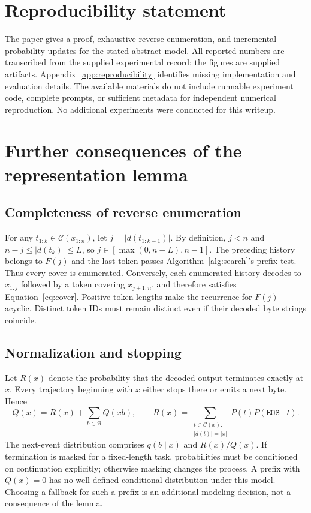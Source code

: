 \documentclass{article}
\newcommand{\bytes}{\mathcal{B}}
\newcommand{\cover}{\mathcal{C}}
\newcommand{\decode}{d}
\newcommand{\eos}{\mathtt{EOS}}
\begin{document}
\section*{Reproducibility statement}
The paper gives a proof, exhaustive reverse enumeration, and incremental probability updates for the stated abstract model. All reported numbers are transcribed from the supplied experimental record; the figures are supplied artifacts. Appendix~\ref{app:reproducibility} identifies missing implementation and evaluation details. The available materials do not include runnable experiment code, complete prompts, or sufficient metadata for independent numerical reproduction. No additional experiments were conducted for this writeup.

\clearpage



\clearpage
\appendix
\section{Further consequences of the representation lemma}
\label{app:proofs}
\subsection{Completeness of reverse enumeration}
For any $t_{1:k}\in\cover(x_{1:n})$, let $j=|\decode(t_{1:k-1})|$. By definition, $j<n$ and $n-j\leq|\decode(t_k)|\leq L$, so $j\in[\max(0,n-L),n-1]$. The preceding history belongs to $F(j)$ and the last token passes Algorithm~\ref{alg:search}'s prefix test. Thus every cover is enumerated. Conversely, each enumerated history decodes to $x_{1:j}$ followed by a token covering $x_{j+1:n}$, and therefore satisfies Equation~\ref{eq:cover}. Positive token lengths make the recurrence for $F(j)$ acyclic. Distinct token IDs must remain distinct even if their decoded byte strings coincide.

\subsection{Normalization and stopping}
Let $R(x)$ denote the probability that the decoded output terminates exactly at $x$. Every trajectory beginning with $x$ either stops there or emits a next byte. Hence
\begin{equation}
 Q(x)=R(x)+\sum_{b\in\bytes}Q(xb),\qquad
 R(x)=\sum_{\substack{t\in\cover(x):\\|\decode(t)|=|x|}}P(t)P(\eos\mid t).
\end{equation}
The next-event distribution comprises $q(b\mid x)$ and $R(x)/Q(x)$. If termination is masked for a fixed-length task, probabilities must be conditioned on continuation explicitly; otherwise masking changes the process. A prefix with $Q(x)=0$ has no well-defined conditional distribution under this model. Choosing a fallback for such a prefix is an additional modeling decision, not a consequence of the lemma.
\end{document}
